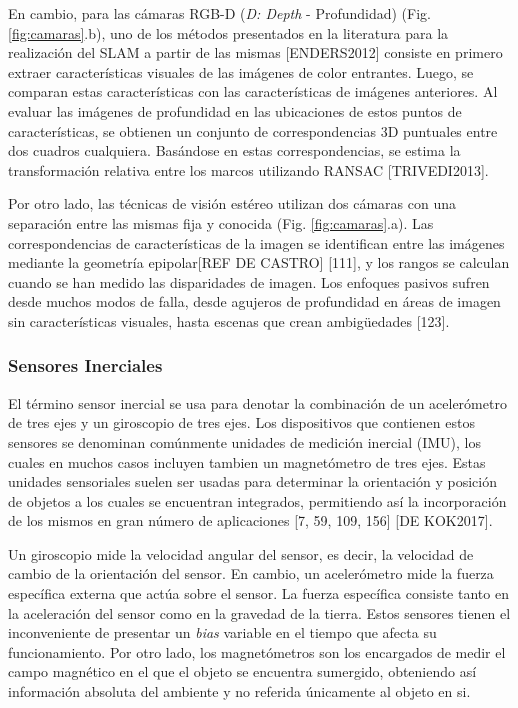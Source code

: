 En cambio, para las cámaras RGB-D (\textit{D: Depth} - Profundidad) (Fig. \ref{fig:camaras}.b), uno de los métodos presentados en la literatura para la realización del SLAM a partir de las mismas [ENDERS2012] consiste en primero extraer características visuales de las imágenes de color entrantes. Luego, se comparan estas características con las características de imágenes anteriores. Al evaluar las imágenes de profundidad en las ubicaciones de estos puntos de características, se obtienen un conjunto de correspondencias 3D puntuales entre dos cuadros cualquiera. Basándose en estas correspondencias, se estima la transformación relativa entre los marcos utilizando RANSAC [TRIVEDI2013].

Por otro lado, las técnicas de visión estéreo utilizan dos cámaras con una separación entre las mismas fija y conocida (Fig. \ref{fig:camaras}.a). Las correspondencias de características de la imagen se identifican entre las imágenes mediante la geometría epipolar[REF DE CASTRO] [111], y los rangos se calculan cuando se han medido las disparidades de imagen. Los enfoques pasivos sufren desde muchos modos de falla, desde agujeros de profundidad en áreas de imagen sin características visuales, hasta escenas que crean ambigüedades [123].


\subsubsection{Sensores Inerciales}
El término sensor inercial se usa para denotar la combinación de un acelerómetro de tres ejes y un giroscopio de tres ejes. Los dispositivos que contienen estos sensores se denominan comúnmente unidades de medición inercial (IMU), los cuales en muchos casos incluyen tambien un magnetómetro de tres ejes. Estas unidades sensoriales suelen ser usadas para determinar la orientación y posición de objetos a los cuales se encuentran integrados, permitiendo así la incorporación de los mismos en gran número de aplicaciones [7, 59, 109, 156] [DE KOK2017].

Un giroscopio mide la velocidad angular del sensor, es decir, la velocidad de cambio de la orientación del sensor. En cambio, un acelerómetro mide la fuerza específica externa que actúa sobre el sensor. La fuerza específica consiste tanto en la aceleración del sensor como en la gravedad de la tierra. Estos sensores tienen el inconveniente de presentar un \textit{bias} variable en el tiempo que afecta su funcionamiento. Por otro lado, los magnetómetros son los encargados de medir el campo magnético en el que el objeto se encuentra sumergido, obteniendo así información absoluta del ambiente y no referida únicamente al objeto en si.

